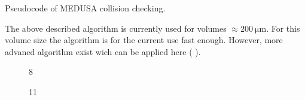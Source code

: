 % 
\begin{lstfloat}[!t]
	
	\caption{Pseudocode of \acs{MEDUSA} collision checking.}
	\label{alg:medusa_collision}
\end{lstfloat}
% 
The above described algorithm is currently used for volumes $\approx \SI{200}{\micro\meter}$. For this volume size the algorithm is for the current use fast enough. However, more advaned algorithm exist wich can be applied here (\eg{}  \cite{Karras2012}).
% 
\begin{figure}[!t]
    \centering
	\caption{8 \cite{Ginsburger2019}}
	\label{fig:medusa_8}
\end{figure}
% 
\begin{figure}[!t]
    \centering
	\caption{11 \cite{Ginsburger2019}}
	\label{fig:medusa_11}
\end{figure}
